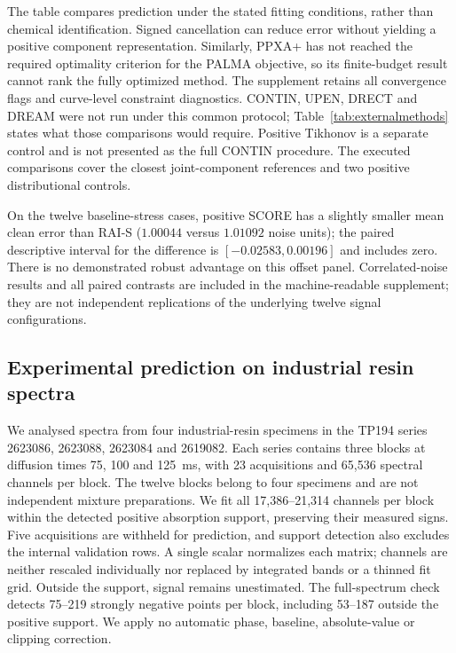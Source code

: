 The table compares prediction under the stated fitting conditions, rather than
chemical identification. Signed cancellation can reduce error without yielding
a positive component representation. Similarly, PPXA+ has not reached the required
optimality criterion for the PALMA objective, so its finite-budget result cannot
rank the fully optimized method. The supplement retains all convergence flags
and curve-level constraint diagnostics. CONTIN, UPEN, DRECT and DREAM were not
run under this common protocol; Table~\ref{tab:externalmethods} states what those
comparisons would require. Positive Tikhonov is a separate control and is not
presented as the full CONTIN procedure. The executed comparisons cover the
closest joint-component references and two positive distributional controls.

On the twelve baseline-stress cases, positive SCORE has a slightly smaller
mean clean error than RAI-S ($1.00044$ versus $1.01092$ noise units); the
paired descriptive interval for the difference is $[-0.02583,0.00196]$ and
includes zero. There is no demonstrated robust advantage on this offset
panel. Correlated-noise results and all paired contrasts are included in
the machine-readable supplement; they are not independent replications of
the underlying twelve signal configurations.


\subsection{Experimental prediction on industrial resin spectra}\label{app:experimentalrevision}
We analysed spectra from four industrial-resin specimens in the TP194 series 2623086, 2623088,
2623084 and 2619082. Each series contains three blocks at diffusion times 75, 100
and 125~ms, with 23 acquisitions and 65,536 spectral channels per block. The twelve
blocks belong to four specimens and are not independent mixture preparations.
We fit all 17,386--21,314 channels per block within the detected positive absorption
support, preserving their measured signs. Five acquisitions are withheld for
prediction, and support detection also excludes the internal validation rows.
A single scalar normalizes each matrix; channels are neither rescaled individually
nor replaced by integrated bands or a thinned fit grid. Outside the support,
signal remains unestimated. The full-spectrum check detects 75--219 strongly
negative points per block, including 53--187 outside the positive support.
We apply no automatic phase, baseline, absolute-value or clipping correction.

